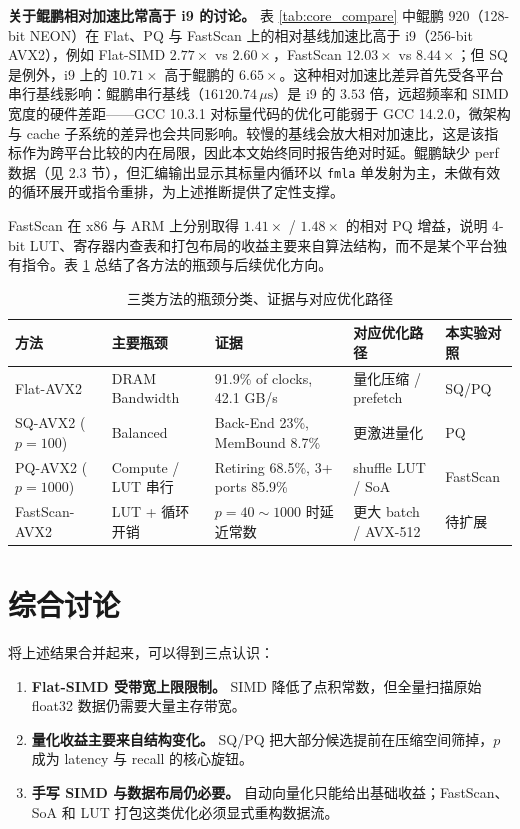 \documentclass[a4paper,11pt,UTF8]{ctexart}
\begin{document}
\noindent\textbf{关于鲲鹏相对加速比常高于 i9 的讨论。} 表 \ref{tab:core_compare} 中鲲鹏 920（128-bit NEON）在 Flat、PQ 与 FastScan 上的相对基线加速比高于 i9（256-bit AVX2），例如 Flat-SIMD $2.77\times$ vs $2.60\times$，FastScan $12.03\times$ vs $8.44\times$；但 SQ 是例外，i9 上的 $10.71\times$ 高于鲲鹏的 $6.65\times$。这种相对加速比差异首先受各平台串行基线影响：鲲鹏串行基线（$16120.74\,\mu\text{s}$）是 i9 的 $3.53$ 倍，远超频率和 SIMD 宽度的硬件差距——GCC 10.3.1 对标量代码的优化可能弱于 GCC 14.2.0，微架构与 cache 子系统的差异也会共同影响。较慢的基线会放大相对加速比，这是该指标作为跨平台比较的内在局限，因此本文始终同时报告绝对时延。鲲鹏缺少 perf 数据（见 2.3 节），但汇编输出显示其标量内循环以 \texttt{fmla} 单发射为主，未做有效的循环展开或指令重排，为上述推断提供了定性支撑。

FastScan 在 x86 与 ARM 上分别取得 $1.41\times$ / $1.48\times$ 的相对 PQ 增益，说明 4-bit LUT、寄存器内查表和打包布局的收益主要来自算法结构，而不是某个平台独有指令。表 \ref{tab:bottleneck} 总结了各方法的瓶颈与后续优化方向。

\begin{table}[H]
  \centering\small
  \begin{tabular}{p{2.3cm}p{2.0cm}p{3.6cm}p{2.5cm}>{\centering\arraybackslash}p{1.9cm}}
    \toprule
    方法 & 主要瓶颈 & 证据 & 对应优化路径 & 本实验对照 \\
    \midrule
    Flat-AVX2 & DRAM Bandwidth & 91.9\% of clocks, 42.1 GB/s & 量化压缩 / prefetch & SQ/PQ \\
    SQ-AVX2 ($p=100$) & Balanced & Back-End 23\%, MemBound 8.7\% & 更激进量化 & PQ \\
    PQ-AVX2 ($p=1000$) & Compute / LUT 串行 & Retiring 68.5\%, 3+ ports 85.9\% & shuffle LUT / SoA & FastScan \\
    FastScan-AVX2 & LUT + 循环开销 & $p=40\sim1000$ 时延近常数 & 更大 batch / AVX-512 & 待扩展 \\
    \bottomrule
  \end{tabular}
  \caption{三类方法的瓶颈分类、证据与对应优化路径}
  \label{tab:bottleneck}
\end{table}

\section{综合讨论}

将上述结果合并起来，可以得到三点认识：
\begin{enumerate}
  \item \textbf{Flat-SIMD 受带宽上限限制。} SIMD 降低了点积常数，但全量扫描原始 float32 数据仍需要大量主存带宽。
  \item \textbf{量化收益主要来自结构变化。} SQ/PQ 把大部分候选提前在压缩空间筛掉，$p$ 成为 latency 与 recall 的核心旋钮。
  \item \textbf{手写 SIMD 与数据布局仍必要。} 自动向量化只能给出基础收益；FastScan、SoA 和 LUT 打包这类优化必须显式重构数据流。
\end{enumerate}
\end{document}
